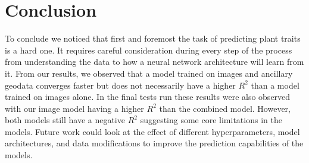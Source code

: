 \documentclass[12pt,a4paper,oneside]{article}
\begin{document}
\section{Conclusion}
To conclude we noticed that first and foremost the task of predicting plant traits is a hard one. It requires careful consideration during every step of the process from understanding the data to how a neural network architecture will learn from it. From our results, we observed that a model trained on images and ancillary geodata converges faster but does not necessarily have a higher $R^2$ than a model trained on images alone. In the final tests run these results were also observed with our image model having a higher $R^2$ than the combined model. However, both models still have a negative $R^2$ suggesting some core limitations in the models. Future work could look at the effect of different hyperparameters, model architectures, and data modifications to improve the prediction capabilities of the models.   

\printbibliography
\end{document}
